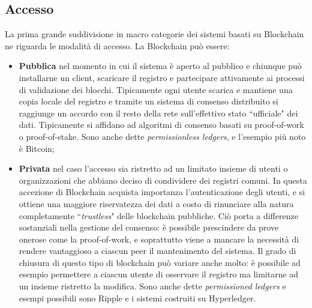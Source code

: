 	\subsection{Accesso}
		La prima grande suddivisione in macro categorie dei sistemi basati su Blockchain ne riguarda le modalità di accesso. La Blockchain può essere:
		\begin{itemize}
			\item \textbf{Pubblica} nel momento in cui il sistema è aperto al pubblico e chiunque può installarne un client, scaricare il registro e partecipare attivamente ai processi di validazione dei blocchi. Tipicamente ogni utente scarica e mantiene una copia locale del registro e tramite un sistema di consenso distribuito si raggiunge un accordo con il resto della rete sull'effettivo stato ``ufficiale" dei dati. Tipicamente si affidano ad algoritmi di consenso basati su proof-of-work o proof-of-stake. Sono anche dette \emph{permissionless ledgers}, e l'esempio più noto è Bitcoin;
			\item \textbf{Privata} nel caso l'accesso sia ristretto ad un limitato insieme di utenti o organizzazioni che abbiano deciso di condividere dei registri comuni. In questa accezione di Blockchain acquista importanza l'autenticazione degli utenti, e si ottiene una maggiore riservatezza dei dati a costo di rinunciare alla natura completamente ``\emph{trustless}" delle blockchain pubbliche. Ciò porta a differenze sostanziali nella gestione del consenso: è possibile prescindere da prove onerose come la proof-of-work, e soprattutto viene a mancare la necessità di rendere vantaggioso a ciascun peer il mantenimento del sistema.
			Il grado di chiusura di questo tipo di blockchain può variare anche molto: è possibile ad esempio permettere a ciascun utente di osservare il registro ma limitarne ad un insieme ristretto la modifica. Sono anche dette \emph{permissioned ledgers} e esempi possibili sono Ripple e i sistemi costruiti su Hyperledger.
		\end{itemize}
	
